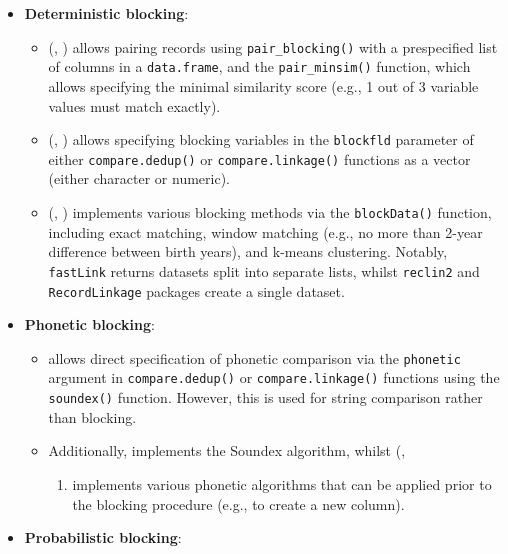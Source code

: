 \begin{itemize}
\tightlist
\item
  \textbf{Deterministic blocking}:

  \begin{itemize}
  \tightlist
  \item
     (\citet{reclin2}, \citet{reclin2-rjournal}) allows pairing
    records using \texttt{pair\_blocking()} with a prespecified list of
    columns in a \texttt{data.frame}, and the \texttt{pair\_minsim()} function,
    which allows specifying the minimal similarity score (e.g., 1
    out of 3 variable values must match exactly).
  \item
     (\citet{RecordLinkage}, \citet{RecordLinkage-rjournal})
    allows specifying blocking variables in the \texttt{blockfld} parameter
    of either \texttt{compare.dedup()} or \texttt{compare.linkage()} functions as
    a vector (either character or numeric).
  \item
     (\citet{fastLink}, \citet{enamorado2019using}) implements
    various blocking methods via the \texttt{blockData()} function,
    including exact matching, window matching (e.g., no more than
    2-year difference between birth years), and k-means clustering.
    Notably, \texttt{fastLink} returns datasets split into separate lists,
    whilst \texttt{reclin2} and \texttt{RecordLinkage} packages create a single
    dataset.
  \end{itemize}
\item
  \textbf{Phonetic blocking}:

  \begin{itemize}
  \tightlist
  \item
     allows direct specification of phonetic
    comparison via the \texttt{phonetic} argument in \texttt{compare.dedup()} or
    \texttt{compare.linkage()} functions using the \texttt{soundex()} function.
    However, this is used for string comparison rather than
    blocking.
  \item
    Additionally,  \citep{stringdist} implements the
    Soundex algorithm, whilst  (\citet{phonics},

    \begin{enumerate}
    \def\labelenumi{\arabic{enumi})}
    \tightlist
    \item
      implements various phonetic algorithms that can
      be applied prior to the blocking procedure (e.g., to create a
      new column).
    \end{enumerate}
  \end{itemize}
\item
  \textbf{Probabilistic blocking}:


\end{itemize}
